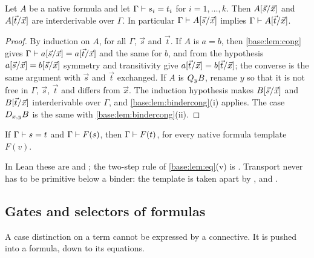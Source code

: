 \begin{theorem}
\label{base:thm:leibniz}
Let $A$ be a native formula and let $\Gamma\vdash s_i=t_i$ for
$i=1,\dots,k$.  Then $A[\vec s/\vec x]$ and $A[\vec t/\vec x]$
are interderivable over $\Gamma$.  In particular
$\Gamma\vdash A[\vec s/\vec x]$ implies
$\Gamma\vdash A[\vec t/\vec x]$.
\end{theorem}

\begin{proof}
By induction on $A$, for all $\Gamma$, $\vec s$ and $\vec t$.  If $A$ is
$a=b$, then \cref{base:lem:cong} gives
$\Gamma\vdash a[\vec s/\vec x]=a[\vec t/\vec x]$ and the same
for $b$, and from the hypothesis
$a[\vec s/\vec x]=b[\vec s/\vec x]$ symmetry and transitivity
give $a[\vec t/\vec x]=b[\vec t/\vec x]$; the converse is the
same argument with $\vec s$ and $\vec t$ exchanged.  If $A$ is $Q_{y}B$,
rename $y$ so that it is not free in $\Gamma$, $\vec s$, $\vec t$ and
differs from $\vec x$.  The induction hypothesis makes
$B[\vec s/\vec x]$ and $B[\vec t/\vec x]$ interderivable over
$\Gamma$, and \cref{base:lem:bindercong}(i) applies.  The case $D_{x,y}B$
is the same with \cref{base:lem:bindercong}(ii).
\end{proof}

\begin{corollary}
\label{base:cor:tr}
If $\Gamma\vdash s=t$ and $\Gamma\vdash F(s)$, then $\Gamma\vdash F(t)$,
for every native formula template $F(v)$.
\end{corollary}

In Lean these are  and ; the two-step rule
of \cref{base:lem:eq}(v) is .  Transport never has to be
primitive below a binder: the template is taken apart by ,
 and .

\subsection{Gates and selectors of formulas}

A case distinction on a term cannot be expressed by a connective.  It is
pushed into a formula, down to its equations.

